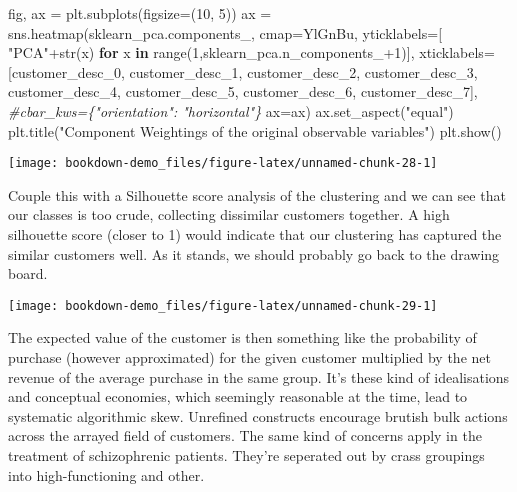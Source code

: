 \documentclass[]{tufte-book}
\newenvironment{Shaded}{}{}
\newcommand{\BuiltInTok}[1]{#1}
\newcommand{\CommentTok}[1]{\textcolor[rgb]{0.38,0.63,0.69}{\textit{#1}}}
\newcommand{\ControlFlowTok}[1]{\textcolor[rgb]{0.00,0.44,0.13}{\textbf{#1}}}
\newcommand{\DecValTok}[1]{\textcolor[rgb]{0.25,0.63,0.44}{#1}}
\newcommand{\KeywordTok}[1]{\textcolor[rgb]{0.00,0.44,0.13}{\textbf{#1}}}
\newcommand{\NormalTok}[1]{#1}
\newcommand{\OperatorTok}[1]{\textcolor[rgb]{0.40,0.40,0.40}{#1}}
\newcommand{\StringTok}[1]{\textcolor[rgb]{0.25,0.44,0.63}{#1}}
\theoremstyle{definition}
\theoremstyle{definition}
\theoremstyle{definition}
\theoremstyle{remark}
\begin{document}
\begin{Shaded}
\begin{Highlighting}[]
\NormalTok{fig, ax }\OperatorTok{=}\NormalTok{ plt.subplots(figsize}\OperatorTok{=}\NormalTok{(}\DecValTok{10}\NormalTok{, }\DecValTok{5}\NormalTok{))}
\NormalTok{ax }\OperatorTok{=}\NormalTok{ sns.heatmap(sklearn\_pca.components\_,}
\NormalTok{                 cmap}\OperatorTok{=}\StringTok{\textquotesingle{}YlGnBu\textquotesingle{}}\NormalTok{,}
\NormalTok{                 yticklabels}\OperatorTok{=}\NormalTok{[ }\StringTok{"PCA"}\OperatorTok{+}\BuiltInTok{str}\NormalTok{(x) }\ControlFlowTok{for}\NormalTok{ x }\KeywordTok{in} \BuiltInTok{range}\NormalTok{(}\DecValTok{1}\NormalTok{,sklearn\_pca.n\_components\_}\OperatorTok{+}\DecValTok{1}\NormalTok{)],}
\NormalTok{  xticklabels}\OperatorTok{=}\NormalTok{[}\StringTok{\textquotesingle{}customer\_desc\_0\textquotesingle{}}\NormalTok{, }\StringTok{\textquotesingle{}customer\_desc\_1\textquotesingle{}}\NormalTok{, }\StringTok{\textquotesingle{}customer\_desc\_2\textquotesingle{}}\NormalTok{,}
  \StringTok{\textquotesingle{}customer\_desc\_3\textquotesingle{}}\NormalTok{, }\StringTok{\textquotesingle{}customer\_desc\_4\textquotesingle{}}\NormalTok{, }\StringTok{\textquotesingle{}customer\_desc\_5\textquotesingle{}}\NormalTok{,}
  \StringTok{\textquotesingle{}customer\_desc\_6\textquotesingle{}}\NormalTok{, }\StringTok{\textquotesingle{}customer\_desc\_7\textquotesingle{}}\NormalTok{],}
  \CommentTok{\#cbar\_kws=\{"orientation": "horizontal"\}}
\NormalTok{  ax}\OperatorTok{=}\NormalTok{ax)}
\NormalTok{ax.set\_aspect(}\StringTok{"equal"}\NormalTok{)}
\NormalTok{plt.title(}\StringTok{"Component Weightings of the original observable variables"}\NormalTok{)}
\NormalTok{plt.show()}
\end{Highlighting}
\end{Shaded}

\texttt{[image: bookdown-demo\_files/figure-latex/unnamed-chunk-28-1]}

Couple this with a Silhouette score analysis of the clustering and we can see that our classes is too crude, collecting dissimilar customers together. A high silhouette score (closer to 1) would indicate that our clustering has captured the similar customers well. As it stands, we should probably go back to the drawing board.

\texttt{[image: bookdown-demo\_files/figure-latex/unnamed-chunk-29-1]}

The expected value of the customer is then something like the probability of purchase (however approximated) for the given customer multiplied by the net revenue of the average purchase in the same group. It's these kind of idealisations and conceptual economies, which seemingly reasonable at the time, lead to systematic algorithmic skew. Unrefined constructs encourage brutish bulk actions across the arrayed field of customers. The same kind of concerns apply in the treatment of schizophrenic patients. They're seperated out by crass groupings into high-functioning and other.
\end{document}
